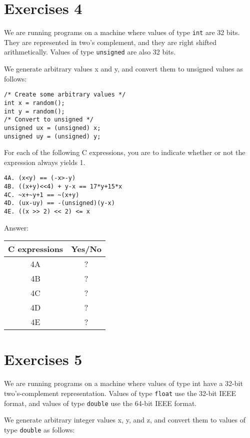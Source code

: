 \documentclass[a4paper]{article}
\begin{document}
\section{Exercises 4}
We are running programs on a machine where values of type \texttt{int} are 32 bits. They are represented in two's complement, and they are right shifted arithmetically. Values of type \texttt{unsigned} are also 32 bits. 

We generate arbitrary values x and y, and convert them to unsigned values as follows:

\begin{verbatim}
/* Create some arbitrary values */
int x = random();
int y = random();
/* Convert to unsigned */
unsigned ux = (unsigned) x;
unsigned uy = (unsigned) y;
\end{verbatim}

For each of the following C expressions, you are to indicate whether or not the expression always yields 1.

\begin{verbatim}
4A. (x<y) == (-x>-y)
4B. ((x+y)<<4) + y-x == 17*y+15*x
4C. ~x+~y+1 == ~(x+y)
4D. (ux-uy) == -(unsigned)(y-x)
4E. ((x >> 2) << 2) <= x
\end{verbatim}

Answer: %

\begin{table}[ht]
\begin{tabular}{|c|c|}
\hline
C expressions&Yes/No\\
\hline
4A & ? \\
\hline
4B & ? \\
\hline
4C & ? \\
\hline
4D & ? \\
\hline
4E & ? \\
\hline
\end{tabular}
\end{table}

\section{Exercises 5}
We are running programs on a machine where values of type int have a 32-bit two's-complement representation. Values of type \texttt{float} use the 32-bit IEEE format, and values of type \texttt{double} use the 64-bit IEEE format.

We generate arbitrary integer values x, y, and z, and convert them to values of type \texttt{double} as follows:
\end{document}

